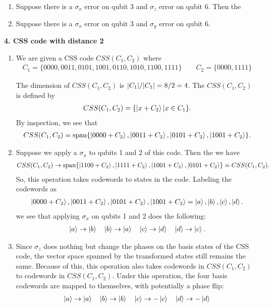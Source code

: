 \documentclass{article}
\theoremstyle{definition}
\begin{document}
\begin{enumerate}[label=(\alph*)]
	\item Suppose there is a $\sigma_x$ error on qubit 3 and $\sigma_z$ error on qubit 6. Then the 
	
	\item Suppose there is a $\sigma_x$ error on qubit 3 and $\sigma_y$ error on qubit 6. 
	
\end{enumerate}


\noindent \textbf{4. CSS code with distance 2}

\begin{enumerate}[label=(\alph*)]
	\item We are given a CSS code $CSS(C_1,C_2)$ where
	\begin{align*}
		C_1 = \{ 0000,0011,0101,1001,0110,1010,1100,1111  \} \quad\quad C_2 = \{ 0000, 1111 \}
	\end{align*}
	
	The dimension of $CSS(C_1,C_2)$ is $\abs{C_1}/\abs{C_1} = 8/2 = 4$. The $CSS(C_1, C_2)$ is defined by 
	\begin{align*}
		CSS(C_1, C_2) =  \{ \ket{x+C_2}  \vert x\in C_1 \}.
	\end{align*}
	By inspection, we see that
	\begin{align*}
		CSS(C_1,C_2) = \text{span}\{ \ket{0000+C_2} , \ket{0011+C_2} , \ket{0101+C_2} , \ket{1001+C_2}   \}.
	\end{align*}
	
	
	\item Suppose we apply a $\sigma_x$ to qubits 1 and 2 of this code. Then the we have 
	\begin{align*}
		CSS(C_1,C_2) \to \text{span} \{ \ket{1100+C_2} , \ket{1111+C_2} , \ket{1001+C_2} , \ket{0101+C_2}   \} = CSS(C_1,C_2).
	\end{align*}
	So, this operation takes codewords to states in the code. Labeling the codewords as 
	\begin{align*}
		 \ket{0000+C_2} , \ket{0011+C_2} , \ket{0101+C_2} , \ket{1001+C_2}    =  \ket{a}, \ket{b}, \ket{c}, \ket{d} .
	\end{align*}
	we see that applying $\sigma_x$ on qubits 1 and 2 does the following:
	\begin{align*}
		\ket{a} \to \ket{b} \quad \ket{b} \to \ket{a} \quad \ket{c} \to \ket{d} \quad \ket{d} \to \ket{c}.
	\end{align*}
	
	
	\item Since $\sigma_z$ does nothing but change the phases on the basis states of the CSS code, the vector space spanned by the transformed states still remains the same. Because of this, this operation also takes codewords in $CSS(C_1, C_2)$ to codewords in $CSS(C_1, C_2)$. Under this operation, the four basis codewords are mapped to themselves, with potentially a phase flip:
	\begin{align*}
		\ket{a} \to \ket{a} \quad \ket{b} \to \ket{b} \quad \ket{c} \to - \ket{c} \quad \ket{d} \to -\ket{d}
	\end{align*}
	

\end{enumerate}
\end{document}
